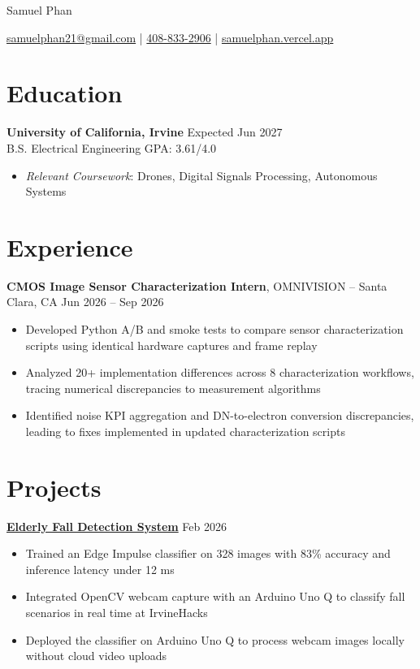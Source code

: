 \documentclass[11pt]{article}       %
\newcommand{\resumeSubheading}[3]{\textbf{#1}{#2} \hfill #3 \\ \vspace{-9pt}}
\newcommand{\resumeItem}[1]{\item #1}
\newcommand{\resumeItemWithoutTitle}[2]{\item \textit{Relevant Coursework}: #2}
\begin{document}
\centerline{\Huge Samuel Phan}

\vspace{5pt}

\centerline{\href{mailto:samuelphan21@gmail.com}{samuelphan21@gmail.com} | \href{tel:14088332906}{408-833-2906} |
 \href{https://samuelphan.vercel.app}{samuelphan.vercel.app}}

\vspace{-10pt}

\section*{Education}
\textbf{University of California, Irvine} \hfill Expected Jun 2027 \\
B.S. Electrical Engineering  \hfill GPA: 3.61/4.0 \\
\vspace{-6.5pt}
\begin{itemize}
  \resumeItemWithoutTitle{}{Drones, Digital Signals Processing, Autonomous Systems}
\end{itemize}

\vspace {-10pt}

\section*{Experience}
\resumeSubheading{CMOS Image Sensor Characterization Intern}{, OMNIVISION -- Santa Clara, CA}{Jun 2026 -- Sep 2026}
\begin{itemize}
  \resumeItem{Developed Python A/B and smoke tests to compare sensor characterization scripts using identical hardware captures and frame replay}
  \resumeItem{Analyzed 20+ implementation differences across 8 characterization workflows, tracing numerical discrepancies to measurement algorithms}
  \resumeItem{Identified noise KPI aggregation and DN-to-electron conversion discrepancies, leading to fixes implemented in updated characterization scripts}
\end{itemize}

\vspace{-\bigskipamount}

\section*{Projects}
\resumeSubheading{\href{https://github.com/kevinlycc/UnderWatch}{Elderly Fall Detection System}}{}{Feb 2026}
\begin{itemize}
  \resumeItem{Trained an Edge Impulse classifier on 328 images with 83\% accuracy and inference latency under 12 ms}
  \resumeItem{Integrated OpenCV webcam capture with an Arduino Uno Q to classify fall scenarios in real time at IrvineHacks}
  \resumeItem{Deployed the classifier on Arduino Uno Q to process webcam images locally without cloud video uploads}
\end{itemize}
\end{document}
